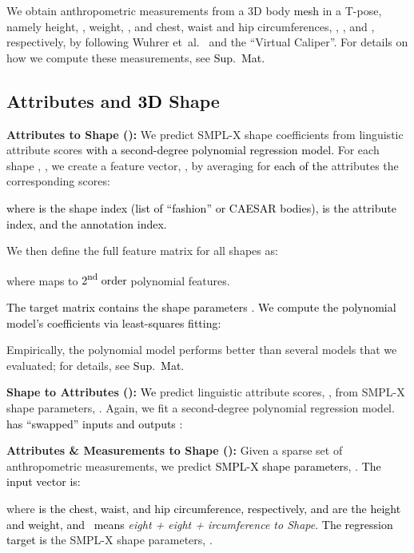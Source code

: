 \documentclass[10pt,twocolumn,letterpaper]{article}
\newcommand{\zheading}[1]{\textbf{#1:}}
\newcommand{\TODO}[1]{\xspace{\color{red} #1}\xspace}
\renewcommand{\TODO}[1]{\xspace{\color{black} #1}\xspace}
\newcommand{\colorheight}{\color{Bittersweet}}
\newcommand{\colorweight}{\color{Orange}}
\newcommand{\colorcirc}{\color{OrangeRed}}
\newcommand{\colorFMtoS}{\text{\mbox{{\colorheight{H}}{\colorweight{W}}{\colorcirc{C}}2S}}\xspace}
\newcommand{\vcaliper}{``Virtual Caliper''\xspace}
\newcommand{\virtualcaliper}{\vcaliper}
\newcommand{\AtoS}{\text{\mbox{A2S}}\xspace}
\newcommand{\StoA}{\text{\mbox{S2A}}\xspace}
\newcommand{\AFMtoS}{\text{\mbox{AHWC2S}}\xspace}
\newcommand{\threeD}{3D\xspace}
\newcommand{\smplx}{\mbox{SMPL-X}\xspace}
\newcommand{\smplX}{\smplx}
\newcommand{\caesar}{\mbox{CAESAR}\xspace}
\newcommand{\supmat}{{\mbox{\textcolor{black}{Sup.~Mat.}}}\xspace}
\renewcommand{\etal}{\mbox{et al.}\xspace}
\newcommand{\cameraready}[1]{\textcolor{Fuchsia}{{#1}}\xspace}
\renewcommand{\cameraready}[1]{\textcolor{black}{{#1}}\xspace}
\newcommand{\colorTERM}{blue}
\renewcommand{\colorTERM}{black}
\newcommand{\measurements}[0]{{\color{\colorTERM}anthropometric measurements}\xspace}
\newcommand{\scores}[0]{{scores}\xspace}
\newcommand{\linguisticattributescores}[0]{{\color{\colorTERM}linguistic attribute \scores}\xspace}
\begin{document}
We obtain \measurements from a \threeD body \cameraready{mesh} in a \mbox{T-pose},
namely 
height, , weight, ,
and chest, waist and hip circumferences, , ,
and , respectively,
by following 
Wuhrer \etal~\cite{wuhrer2013estimating} and the
\virtualcaliper \cite{pujades2019virtual}.
For details on how we compute these measurements, see \supmat


\subsection{Attributes and \cameraready{\threeD} Shape}  


\zheading{Attributes to Shape (\textbf{\AtoS})}
We predict \smplX shape coefficients from \linguisticattributescores
\cameraready{with a second-degree polynomial regression model.}
For each shape , , we create a feature vector,
\TODO{}, by averaging 
for \cameraready{each of the}  attributes 
the corresponding \cameraready{} \scores:

\cameraready{where 
 is the shape        index (list of ``fashion'' or \caesar bodies), 
 is the attribute    index, and 
    the annotation   index.}

\noindent
We then define the full feature matrix for all  shapes as:

where  maps  to
\cameraready{2\textsuperscript{nd} order}
polynomial features.

\noindent
\cameraready{The target matrix  contains 
the shape parameters 
. 
We compute 
the polynomial model's coefficients  
via least-squares fitting:}

Empirically, the polynomial model performs better than several models that we evaluated; 
for details, see \supmat 


\zheading{Shape to Attributes (\StoA)}
\cameraready{We} 
predict \linguisticattributescores,
\cameraready{}, 
from \smplX shape parameters, .
Again, we  fit a second-degree polynomial regression model.
\cameraready{\StoA has ``swapped'' inputs and outputs \wrt \AtoS:}


\zheading{Attributes \& Measurements to Shape (\AFMtoS)}
Given a sparse set of 
\measurements, 
we predict 
\cameraready{\smplX shape parameters}, 
.
\cameraready{The input vector is:}

where
\cameraready{ is the chest, waist, and hip circumference, respectively, 
 and  are the height and weight, and}
\colorFMtoS~\cameraready{means} \textit{{\colorheight{H}}eight + {\colorweight{W}}eight + {\colorcirc{C}}ircumference to Shape}.
\cameraready{The regression target is} the \smplX shape parameters, .
\end{document}
